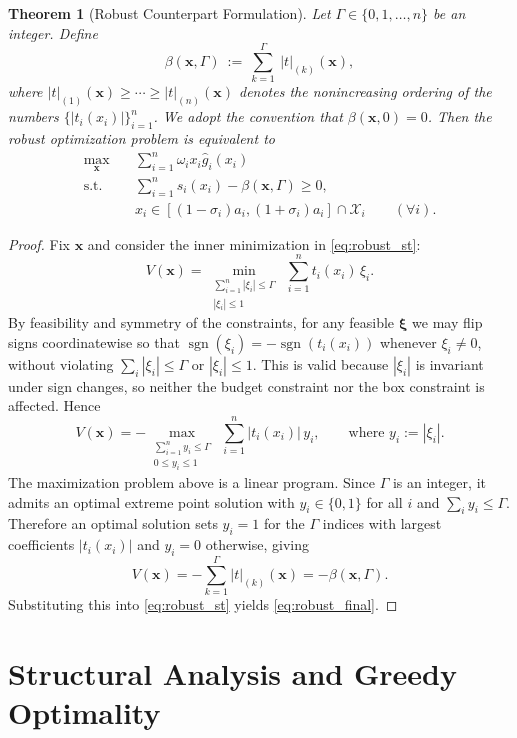 \documentclass[11pt, a4paper]{article}
\theoremstyle{plain}
\newtheorem{theorem}{Theorem}
\theoremstyle{definition}
\theoremstyle{remark}
\begin{document}
\begin{theorem}[Robust Counterpart Formulation]\label{thm:robust}
Let $\Gamma \in \{0,1,\dots,n\}$ be an integer. Define
\[
\beta(\bm{x},\Gamma)
\ :=\
\sum_{k=1}^{\Gamma} \ |t|_{(k)}(\bm{x}),
\]
where $|t|_{(1)}(\bm{x}) \ge \cdots \ge |t|_{(n)}(\bm{x})$ denotes the nonincreasing ordering of the numbers
$\big\{|t_i(x_i)|\big\}_{i=1}^n$. We adopt the convention that $\beta(\bm{x},0)=0$.
Then the robust optimization problem is equivalent to
\begin{align}
    \max_{\bm{x}} \quad & \sum_{i=1}^n \omega_i x_i \hat{g}_i(x_i) \\
    \text{s.t.} \quad
    & \sum_{i=1}^n s_i(x_i) - \beta(\bm{x}, \Gamma) \ge 0, \label{eq:robust_final}\\
    & x_i \in [(1-\sigma_i)a_i,(1+\sigma_i)a_i]\cap \mathcal X_i \qquad (\forall i). \nonumber
\end{align}
\end{theorem}

\begin{proof}
Fix $\bm{x}$ and consider the inner minimization in \eqref{eq:robust_st}:
\[
V(\bm{x})
=
\min_{\substack{\sum_{i=1}^n|\xi_i|\le \Gamma\\ |\xi_i|\le 1}}
\ \sum_{i=1}^n t_i(x_i)\,\xi_i .
\]
By feasibility and symmetry of the constraints, for any feasible $\bm{\xi}$ we may flip signs coordinatewise so that
$\operatorname{sgn}(\xi_i)=-\operatorname{sgn}(t_i(x_i))$ whenever $\xi_i\neq 0$, without violating
$\sum_i|\xi_i|\le \Gamma$ or $|\xi_i|\le 1$. This is valid because $|\xi_i|$ is invariant under sign changes, so neither the budget constraint
nor the box constraint is affected. Hence
\[
V(\bm{x})
=
-\max_{\substack{\sum_{i=1}^n y_i \le \Gamma\\ 0\le y_i \le 1}}
\ \sum_{i=1}^n |t_i(x_i)|\,y_i ,
\qquad\text{where } y_i:=|\xi_i|.
\]
The maximization problem above is a linear program. Since $\Gamma$ is an integer, it admits an optimal extreme point solution
with $y_i\in\{0,1\}$ for all $i$ and $\sum_i y_i\le \Gamma$.
Therefore an optimal solution sets $y_i=1$ for the $\Gamma$ indices with largest coefficients $|t_i(x_i)|$ and $y_i=0$ otherwise, giving
\[
V(\bm{x})
=
-\sum_{k=1}^{\Gamma} |t|_{(k)}(\bm{x})
=
-\beta(\bm{x},\Gamma).
\]
Substituting this into \eqref{eq:robust_st} yields \eqref{eq:robust_final}.
\end{proof}

\section{Structural Analysis and Greedy Optimality}\label{sec:structure}
\end{document}
